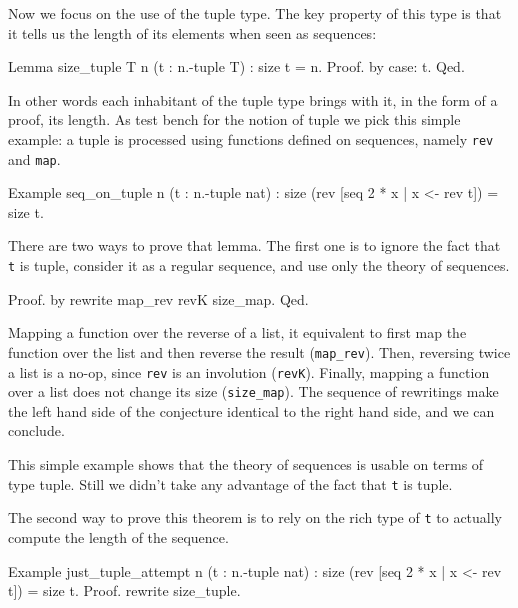 Now we focus on the use of the tuple type.  The key property of this
type is that it tells us the length of its elements when seen as
sequences:

\begin{coq}{}
Lemma size_tuple {T n} (t : n.-tuple T) : size t = n.
Proof. by case: t. Qed.
\end{coq}

In other words each inhabitant of the tuple type brings with it,
in the form of a proof, its length.  As test bench for the notion
of tuple we pick this simple example: a tuple is processed using
functions defined on sequences, namely \lstinline/rev/ and
\lstinline/map/.

\begin{coq}{}
Example seq_on_tuple n (t : n.-tuple nat) :
  size (rev [seq 2 * x | x <- rev t]) = size t.
\end{coq}

There are two ways to prove that lemma.  The first one is
to ignore the fact that \lstinline/t/ is tuple, consider it
as a regular sequence, and use only the theory of sequences.

\begin{coq}{}
Proof. by rewrite map_rev revK size_map. Qed.
\end{coq}

Mapping a function over the reverse of a list, it equivalent to
first map the function over the list and then reverse the result
(\lstinline/map_rev/).  Then, reversing twice a list is a no-op, since
\lstinline/rev/ is an involution
(\lstinline/revK/).  Finally, mapping a function over a list does not
change its size (\lstinline/size_map/).  The sequence of rewritings
make the left hand side of the conjecture identical to the right hand
side, and we can conclude.

This simple example shows that the theory of sequences is usable
on terms of type tuple.  Still we didn't take any advantage of
the fact that  \lstinline/t/ is tuple.

The second way to prove this theorem is to rely on the rich type
of \lstinline/t/ to actually compute the length of the sequence.

\begin{coq}{}
Example just_tuple_attempt n (t : n.-tuple nat) :
  size (rev [seq 2 * x | x <- rev t]) = size t.
Proof. rewrite size_tuple.
\end{coq}

